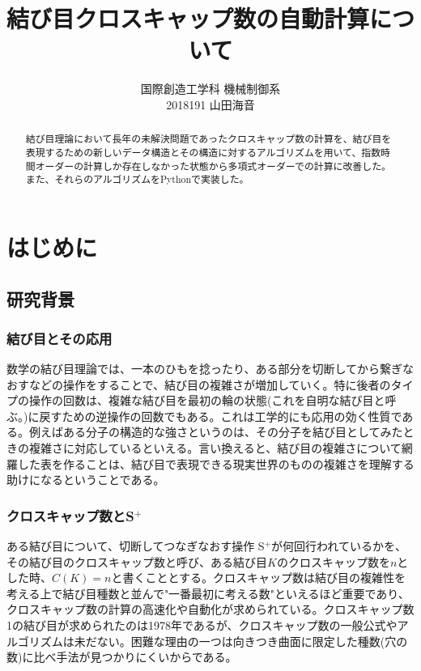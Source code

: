 \documentclass[11pt,a4j]{jarticle}
\title{結び目クロスキャップ数の自動計算について}
\author{国際創造工学科 機械制御系\\2018191 山田海音}
\date{} %
\newcommand{\splus}{S${}^\text{+}$}
\newcommand{\tops}[2]{\texorpdfstring{#1}{#2}} %
\begin{document}
\maketitle
\vspace{30mm}
\begin{abstract}
結び目理論において長年の未解決問題であったクロスキャップ数の計算を、結び目を表現するための新しいデータ構造とその構造に対するアルゴリズムを用いて、指数時間オーダーの計算しか存在しなかった状態から多項式オーダーでの計算に改善した。また、それらのアルゴリズムをPythonで実装した。
\end{abstract}

\clearpage

\tableofcontents
\clearpage

\pagestyle{plain}
\lhead{\rightmark}

\section{はじめに}
\subsection{研究背景}
\subsubsection{結び目とその応用}
数学の結び目理論では、一本のひもを捻ったり、ある部分を切断してから繋ぎなおすなどの操作をすることで、結び目の複雑さが増加していく。特に後者のタイプの操作の回数は、複雑な結び目を最初の輪の状態(これを自明な結び目と呼ぶ。)に戻すための逆操作の回数でもある。これは工学的にも応用の効く性質である。例えばある分子の構造的な強さというのは、その分子を結び目としてみたときの複雑さに対応しているといえる。言い換えると、結び目の複雑さについて網羅した表を作ることは、結び目で表現できる現実世界のものの複雑さを理解する助けになるということである。

\subsubsection{クロスキャップ数と\tops{\splus}{splus}}
ある結び目について、切断してつなぎなおす操作 \splus が何回行われているかを、その結び目のクロスキャップ数と呼び、ある結び目$K$のクロスキャップ数を$n$とした時、$C(K)=n$と書くこととする。クロスキャップ数は結び目の複雑性を考える上で結び目種数と並んで"一番最初に考える数"といえるほど重要であり、クロスキャップ数の計算の高速化や自動化が求められている。クロスキャップ数1の結び目が求められたのは1978年であるが、クロスキャップ数の一般公式やアルゴリズムは未だない。困難な理由の一つは向きつき曲面に限定した種数(穴の数)に比べ手法が見つかりにくいからである。
\end{document}
